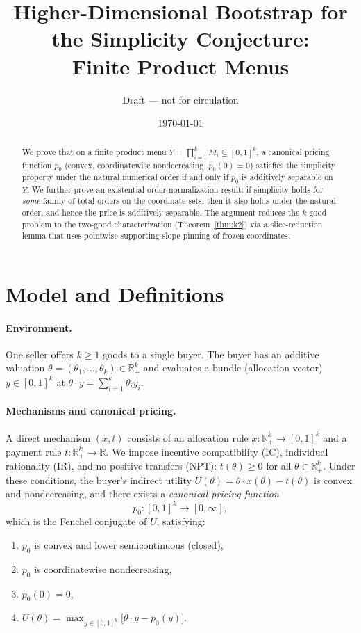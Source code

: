 \documentclass[11pt]{article}
\title{Higher-Dimensional Bootstrap for the Simplicity Conjecture:\\
Finite Product Menus}
\author{Draft --- not for circulation}
\date{\today}
\newcommand{\R}{\mathbb{R}}
\newcommand{\Rp}{\R_+}
\begin{document}
\maketitle

\begin{abstract}
We prove that on a finite product menu $Y = \prod_{i=1}^k M_i \subseteq [0,1]^k$,
a canonical pricing function $p_0$ (convex, coordinatewise nondecreasing, $p_0(0)=0$)
satisfies the simplicity property under the natural numerical order if and only if
$p_0$ is additively separable on $Y$.  We further prove an existential
order-normalization result: if simplicity holds for \emph{some} family of total
orders on the coordinate sets, then it also holds under the natural order,
and hence the price is additively separable.
The argument reduces the $k$-good problem to the two-good
characterization (Theorem~\ref{thm:k2}) via a slice-reduction lemma that uses
pointwise supporting-slope pinning of frozen coordinates.
\end{abstract}

\section{Model and Definitions}\label{sec:model}

\paragraph{Environment.}
One seller offers $k \geq 1$ goods to a single buyer.
The buyer has an additive valuation $\theta = (\theta_1,\dots,\theta_k) \in \Rp^k$
and evaluates a bundle (allocation vector) $y \in [0,1]^k$ at $\theta \cdot y = \sum_{i=1}^k \theta_i y_i$.

\paragraph{Mechanisms and canonical pricing.}
A direct mechanism $(x,t)$ consists of an allocation rule $x\colon \Rp^k \to [0,1]^k$
and a payment rule $t\colon \Rp^k \to \R$.
We impose incentive compatibility (IC), individual rationality (IR), and
no positive transfers (NPT): $t(\theta) \geq 0$ for all $\theta \in \Rp^k$.
Under these conditions, the buyer's indirect utility $U(\theta) = \theta \cdot x(\theta) - t(\theta)$
is convex and nondecreasing, and there exists a \emph{canonical pricing function}
\[
  p_0\colon [0,1]^k \to [0,\infty],
\]
which is the Fenchel conjugate of $U$, satisfying:
\begin{enumerate}[label=(\roman*)]
  \item $p_0$ is convex and lower semicontinuous (closed),
  \item $p_0$ is coordinatewise nondecreasing,
  \item $p_0(0) = 0$,
  \item $U(\theta) = \max_{y \in [0,1]^k}\bigl[\theta \cdot y - p_0(y)\bigr]$.
\end{enumerate}
\end{document}
